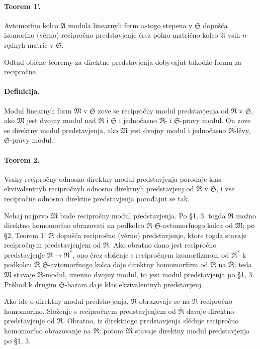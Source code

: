 \documentclass[11pt]{article}
\providecommand{\frM}{\mathfrak M}
\providecommand{\frR}{\mathfrak R}
\providecommand{\frS}{\mathfrak S}
\providecommand{\mA}{\mathfrak A}
\providecommand{\mbarA}{\overline{\mathfrak A}}
\begin{document}
\paragraph{Teorem 1'.}
Avtomorfno kolco \(\mA\) modula linearnyh form \(n\)-togo stepena v \(\frS\) dopušća izomorfno (věrno) recipročno predstavjenje črez polno matrično kolco \(\mbarA\) vsih \(n\)-rędnyh matric v \(\frS\).

Odtud obične teoremy za direktne predstavjenja dobyvajut takodže formu za recipročne.

\paragraph{Definicija.}
Modul linearnyh form \(\frM\) v \(\frS\) zove se recipročny modul predstavjenja od \(\frR\) v \(\frS\), ako \(\frM\) jest dvojny modul nad \(\frR\) i \(\frS\) i jednočasno \(\frR\)- i \(\frS\)-pravy modul. On zove se direktny modul predstavjenja, ako \(\frM\) jest dvojny modul i jednočasno \(\frR\)-lěvy, \(\frS\)-pravy modul.

\paragraph{Teorem 2.}
Vsaky recipročny odnosno direktny modul predstavjenja porođaje klas ekvivalentnyh recipročnyh odnosno direktnyh predstavjenj od \(\frR\) v \(\frS\), i vse recipročne odnosno direktne predstavjenja porođajut se tak.

Nehaj najprvo \(\frM\) bude recipročny modul predstavjenja. Po §1, 3. togda \(\frR\) možno direktno homomorfno obrazovati na podkolco \(\overline{\frR}\) \(\frS\)-avtomorfnogo kolca od \(\frM\); po §2, Teorem 1' \(\overline{\frR}\) dopušća recipročno (věrno) predstavjenje, ktore togda stavaje recipročnym predstavjenjem od \(\frR\). Ako obratno dano jest recipročno predstavjenje \(\frR\to\frR^*\), ono črez složenje s recipročnym izomorfizmom od \(\frR^*\) k podkolcu \(\overline{\frR}\) \(\frS\)-avtomorfnogo kolca daje direktny homomorfizm od \(\frR\) na \(\overline{\frR}\); teda \(\frM\) stavaje \(\frR\)-modul, imenno dvojny modul, to jest modul predstavjenja po §1, 3. Prěhod k drugim \(\frS\)-bazam daje klas ekvivalentnyh predstavjenj.

Ako ide o direktny modul predstavjenja, \(\frR\) obrazovaje se na \(\overline{\frR}\) recipročno homomorfno. Složenje s recipročnym predstavjenjem od \(\overline{\frR}\) davaje direktno predstavjenje od \(\frR\). Obratno, iz direktnogo predstavjenja slěduje recipročno homomorfno obrazovanje na \(\overline{\frR}\); potom \(\frM\) stavaje direktny modul predstavjenja po §1, 3.
\end{document}
